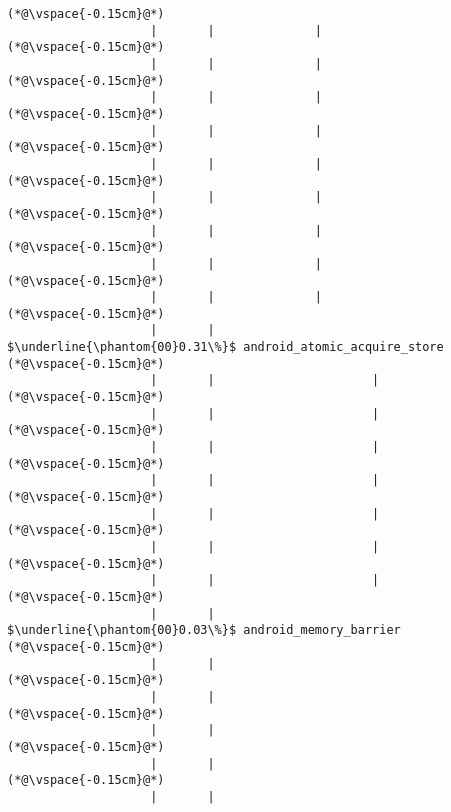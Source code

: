 \begin{lstlisting}[caption=Metodikutsu C$\to$Java 20 int-parametrilla, label=profile:C2JBenchmark00146, numberbychapter=true, frame=lines, float, floatplacement=t]
(*@\vspace{-0.15cm}@*)
                    |       |              |
(*@\vspace{-0.15cm}@*)
                    |       |              |
(*@\vspace{-0.15cm}@*)
                    |       |              |
(*@\vspace{-0.15cm}@*)
                    |       |              |
(*@\vspace{-0.15cm}@*)
                    |       |              |
(*@\vspace{-0.15cm}@*)
                    |       |              |
(*@\vspace{-0.15cm}@*)
                    |       |              |
(*@\vspace{-0.15cm}@*)
                    |       |              |
(*@\vspace{-0.15cm}@*)
                    |       |              |
(*@\vspace{-0.15cm}@*)
                    |       |               $\underline{\phantom{00}0.31\%}$ android_atomic_acquire_store
(*@\vspace{-0.15cm}@*)
                    |       |                      |
(*@\vspace{-0.15cm}@*)
                    |       |                      |
(*@\vspace{-0.15cm}@*)
                    |       |                      |
(*@\vspace{-0.15cm}@*)
                    |       |                      |
(*@\vspace{-0.15cm}@*)
                    |       |                      |
(*@\vspace{-0.15cm}@*)
                    |       |                      |
(*@\vspace{-0.15cm}@*)
                    |       |                      |
(*@\vspace{-0.15cm}@*)
                    |       |                       $\underline{\phantom{00}0.03\%}$ android_memory_barrier
(*@\vspace{-0.15cm}@*)
                    |       |       
(*@\vspace{-0.15cm}@*)
                    |       |       
(*@\vspace{-0.15cm}@*)
                    |       |       
(*@\vspace{-0.15cm}@*)
                    |       |       
(*@\vspace{-0.15cm}@*)
                    |       |       

\end{lstlisting}
